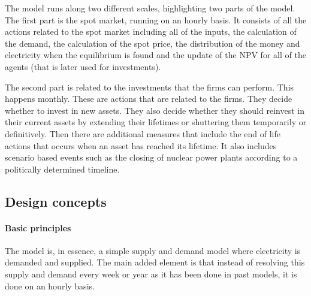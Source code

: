 The model runs along two different scales, highlighting two parts of the model. The first part is the spot market, running on an hourly basis. It consists of all the actions related to the spot market including all of the inputs, the calculation of the demand, the calculation of the spot price, the distribution of the money and electricity when the equilibrium is found and the update of the NPV for all of the agents (that is later used for investments).

The second part is related to the investments that the firms can perform. This happens monthly. These are actions that are related to the firms. They decide whether to invest in new assets. They also decide whether they should reinvest in their current assets by extending their lifetimes or shuttering them temporarily or definitively. Then there are additional measures that include the end of life actions that occurs when an asset has reached its lifetime. It also includes scenario based events such as the closing of nuclear power plants according to a politically determined timeline.


\subsection{Design concepts}
\label{ssec:design}

\paragraph{Basic principles}

The model is, in essence, a simple supply and demand model where electricity is demanded and supplied. The main added element is that instead of resolving this supply and demand every week or year as it has been done in past models, it is done on an hourly basis.

